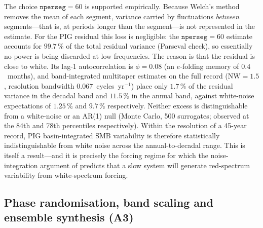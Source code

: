 The choice $\texttt{nperseg}=60$ is supported empirically. Because Welch's
method removes the mean of each segment, variance carried by fluctuations
\emph{between} segments---that is, at periods longer than the segment---is
not represented in the estimate. For the PIG residual this loss is
negligible: the $\texttt{nperseg}=60$ estimate accounts for $99.7\,\%$ of the
total residual variance (Parseval check), so essentially no power is being
discarded at low frequencies. The reason is that the residual is close to
white. Its lag-1 autocorrelation is $\phi=0.08$ (an $e$-folding memory of
$0.4$~months), and band-integrated multitaper estimates on the full record
(NW${}=1.5$, resolution bandwidth $0.067$~cycles~yr$^{-1}$) place only
$1.7\,\%$ of the residual variance in the decadal band and $11.5\,\%$ in the
annual band, against white-noise expectations of $1.25\,\%$ and $9.7\,\%$
respectively. Neither excess is distinguishable from a white-noise or an
AR(1) null (Monte Carlo, 500 surrogates; observed at the 84th and 78th
percentiles respectively). Within the resolution of a 45-year record, PIG
basin-integrated SMB variability is therefore statistically indistinguishable
from white noise across the annual-to-decadal range. This is itself a
result---and it is precisely the forcing regime for which the
noise-integration argument of \citet{hasselmann1976} predicts that a slow
system will generate red-spectrum variability from white-spectrum forcing.

\subsection{Phase randomisation, band scaling and ensemble synthesis
(A3)}\label{sec:synth}

